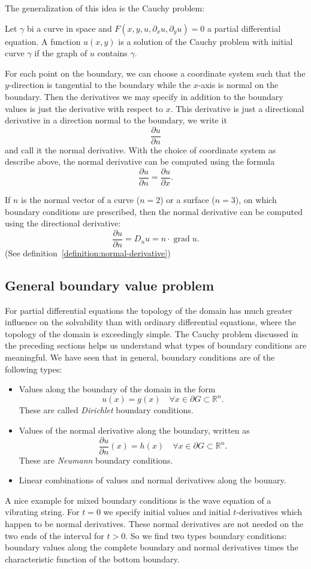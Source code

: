The generalization of this idea is the Cauchy problem:

\begin{problem}
Let $\gamma$ bi a curve in space and 
$F(x,y,u,\partial_xu,\partial_yu)=0$ a partial differential equation.
A function $u(x,y)$ is a solution of the Cauchy problem with initial
curve $\gamma$ if the graph of $u$ contains $\gamma$.
\end{problem}

For each point on the boundary, we can choose a coordinate system such
that the $y$-direction is tangential to the boundary while the $x$-axis
is normal on the boundary.
Then the derivatives we may specify in addition to the boundary
values is just the derivative with respect to $x$.
This derivative is just a directional derivative in a direction normal
to the boundary, we write it
\[
\frac{\partial u}{\partial n}
\]
and call it the normal derivative.
With the choice of coordinate system as describe above, the normal
derivative can be computed using the formula
\[
\frac{\partial u}{\partial n}
=\frac{\partial u}{\partial x}.
\]

If $n$ is the normal vector of a curve ($n=2$) or a surface ($n=3$),
on which boundary conditions are prescribed, then the normal derivative
can be computed using the directional derivative:
\[
\frac{\partial u}{\partial n}=D_nu = n\cdot \operatorname{grad} u.
\]
(See definition~\ref{definition:normal-derivative})

\subsection{General boundary value problem
\label{klassifikation:allgemeines-randwertproblem}}
For partial differential equations the topology of the domain has much
greater influence on the solvability than with ordinary differential
equations, where the topology of the domain is exceedingly simple.
The Cauchy problem discussed in the preceding sections helps us understand
what types of boundary conditions are meaningful.
We have seen that in general, boundary conditions are of the following types:
\begin{itemize}
\item
Values along the boundary of the domain in the form
\[
u(x)=g(x)\quad \forall x\in\partial G\subset \mathbb R^n.
\]
These are called {\em Dirichlet} boundary conditions.
\item
Values of the normal derivative along the boundary, written as
\[
\frac{\partial u}{\partial n}(x)=h(x)\quad\forall x\in\partial G\subset \mathbb R^n.
\]
These are {\em Neumann} boundary conditions.
\item
Linear combinations of values and normal derivatives along the 
bounary.
\end{itemize}
A nice example for mixed boundary conditions is the wave equation of
a vibrating string.
For $t=0$ we specify initial values and initial $t$-derivatives which happen
to be normal derivatives.
These normal derivatives are not needed on the two ends of the interval
for $t>0$.
So we find two types boundary conditions: boundary values along the complete
boundary and normal derivatives times the characteristic function of
the bottom boundary.

